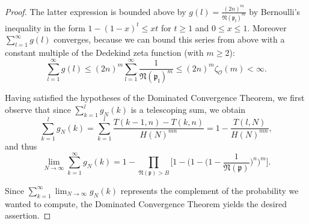 \documentclass[10pt,a4paper]{article}
\theoremstyle{definition}
\theoremstyle{remark}
\newcommand{\f}[1]{\mathfrak{#1}}
\begin{document}
\begin{proof}
The latter expression is bounded above by $g(l) = \frac{(2n)^m}{\f{N(\f{p}_l)}^m}$ by Bernoulli's inequality in the form $1-(1-x)^t\leq xt$ for $t\geq 1$ and $0\leq x \leq 1$. Moreover $\sum_{l=1}^{\infty} g(l)$ converges, because we can bound this series from above with a constant multiple of the Dedekind zeta function (with $m \geq 2$):
$$\sum_{l=1}^{\infty}g(l)\leq (2n)^m\sum_{l=1}^{\infty}\frac{1}{\f{N(\f{p}_l)}^m}\leq (2n)^m \zeta_{\mathcal{O}}(m) < \infty.$$

Having satisfied the hypotheses of the Dominated Convergence Theorem, we first observe that since $\sum_{k=1}^l g_N(k)$ is a telescoping sum, we obtain
$$\sum_{k=1}^l g_N(k) = \sum_{k=1}^l \frac{T(k-1, n) - T(k, n)}{H(N)^{mn}} = 1 - \frac{T(l,N)}{H(N)^{mn}},$$ 
and thus
$$\lim_{N \to \infty} \sum_{k=1}^{\infty} g_N(k) = 1 - \prod_{\mathfrak{N}(\mathfrak{p}) > B} \Big[1 - \Big(1 - \Big(1 - \frac{1}{\mathfrak{N}(\mathfrak{p})}  \Big)^n\Big)^m\Big].$$

\noindent Since $\displaystyle \sum_{k=1}^{\infty} \lim_{N \to \infty} g_N(k)$ represents the complement of the probability we wanted to compute, the Dominated Convergence Theorem yields the desired assertion.
\end{proof}

\printbibliography
\end{document}

